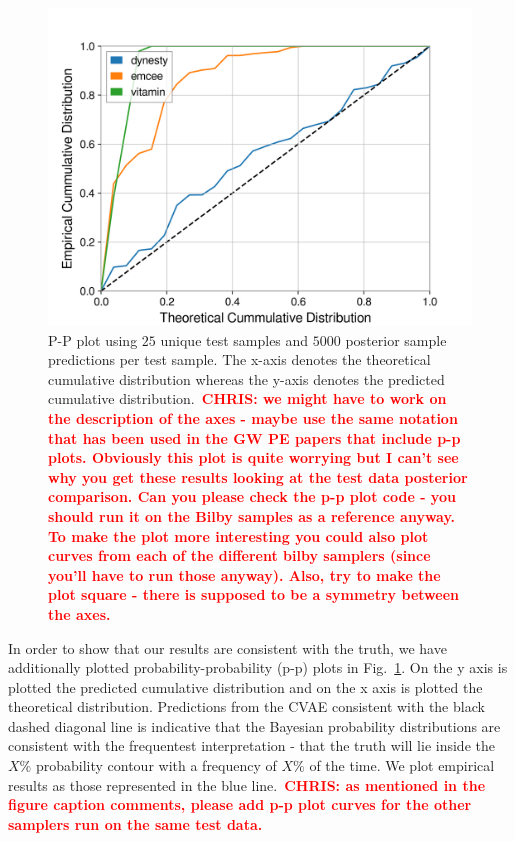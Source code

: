 \documentclass[%
showpacs,
 amsmath,amssymb,
 aps,
 twocolumn,
 prl,
 reprint,
floatfix,
]{revtex4-1}
\newcommand{\chris}[1]{\textbf{\textcolor{red}{CHRIS: #1}}}
\begin{document}
%
%
\begin{figure}
    \includegraphics[width=\columnwidth]{images/latest_pp_plot.png}
    \caption{\label{fig:pp_plot} P-P plot using $25$ unique test samples and
$5000$ posterior sample predictions per test sample.  The x-axis denotes the
theoretical cumulative distribution whereas the y-axis denotes the predicted
cumulative distribution.~\chris{we might have to work on the description of
the axes - maybe use the same notation that has been used in the GW PE papers
that include p-p plots. Obviously this plot is quite worrying but I can't see
why you get these results looking at the test data posterior comparison. Can
you please check the p-p plot code - you should run it on the Bilby samples as
a reference anyway. To make the plot more interesting you could also plot
curves from each of the different bilby samplers (since you'll have to run
those anyway). Also, try to make the plot square - there is supposed to be a
symmetry between the axes.}} 
\end{figure}
%
In order to show that our results are consistent with the truth, we have
additionally plotted probability-probability (p-p) plots in
Fig.~\ref{fig:pp_plot}. On the y axis is plotted the predicted cumulative
distribution and on the x axis is plotted the theoretical distribution.
Predictions from the \ac{CVAE} consistent with the black dashed diagonal 
line is indicative that the Bayesian probability distributions are 
consistent with the frequentest interpretation - that the truth will 
lie inside the $X\%$ probability contour with a frequency of $X\%$ of the time.  We plot empirical results as those represented in the blue line.~\chris{as mentioned in the figure caption comments, please add p-p plot
curves for the other samplers run on the same test data.} 
\end{document}
